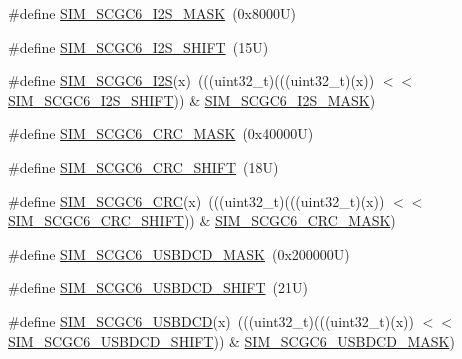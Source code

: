 \begin{DoxyCompactItemize}
\item 
\#define \mbox{\hyperlink{group___s_i_m___register___masks_ga37cb1d6bca1296ed772a4ea87628853b}{S\+I\+M\+\_\+\+S\+C\+G\+C6\+\_\+\+I2\+S\+\_\+\+M\+A\+SK}}~(0x8000\+U)
\item 
\#define \mbox{\hyperlink{group___s_i_m___register___masks_ga012f9b7db6b18ea674e1aac21e8a81df}{S\+I\+M\+\_\+\+S\+C\+G\+C6\+\_\+\+I2\+S\+\_\+\+S\+H\+I\+FT}}~(15\+U)
\item 
\#define \mbox{\hyperlink{group___s_i_m___register___masks_gaf3965076647471e5dd562f891de506a8}{S\+I\+M\+\_\+\+S\+C\+G\+C6\+\_\+\+I2S}}(x)~(((uint32\+\_\+t)(((uint32\+\_\+t)(x)) $<$$<$ \mbox{\hyperlink{group___s_i_m___register___masks_ga012f9b7db6b18ea674e1aac21e8a81df}{S\+I\+M\+\_\+\+S\+C\+G\+C6\+\_\+\+I2\+S\+\_\+\+S\+H\+I\+FT}})) \& \mbox{\hyperlink{group___s_i_m___register___masks_ga37cb1d6bca1296ed772a4ea87628853b}{S\+I\+M\+\_\+\+S\+C\+G\+C6\+\_\+\+I2\+S\+\_\+\+M\+A\+SK}})
\item 
\#define \mbox{\hyperlink{group___s_i_m___register___masks_ga86c274c19f77641dda714eb0cd3fb82f}{S\+I\+M\+\_\+\+S\+C\+G\+C6\+\_\+\+C\+R\+C\+\_\+\+M\+A\+SK}}~(0x40000\+U)
\item 
\#define \mbox{\hyperlink{group___s_i_m___register___masks_gac10c9b2426df8ff8be5656590e5ad323}{S\+I\+M\+\_\+\+S\+C\+G\+C6\+\_\+\+C\+R\+C\+\_\+\+S\+H\+I\+FT}}~(18\+U)
\item 
\#define \mbox{\hyperlink{group___s_i_m___register___masks_ga7e8ce0b7b069947a9bd3a53834537d44}{S\+I\+M\+\_\+\+S\+C\+G\+C6\+\_\+\+C\+RC}}(x)~(((uint32\+\_\+t)(((uint32\+\_\+t)(x)) $<$$<$ \mbox{\hyperlink{group___s_i_m___register___masks_gac10c9b2426df8ff8be5656590e5ad323}{S\+I\+M\+\_\+\+S\+C\+G\+C6\+\_\+\+C\+R\+C\+\_\+\+S\+H\+I\+FT}})) \& \mbox{\hyperlink{group___s_i_m___register___masks_ga86c274c19f77641dda714eb0cd3fb82f}{S\+I\+M\+\_\+\+S\+C\+G\+C6\+\_\+\+C\+R\+C\+\_\+\+M\+A\+SK}})
\item 
\#define \mbox{\hyperlink{group___s_i_m___register___masks_gaffd5a351cb6080fec607562adabf3d21}{S\+I\+M\+\_\+\+S\+C\+G\+C6\+\_\+\+U\+S\+B\+D\+C\+D\+\_\+\+M\+A\+SK}}~(0x200000\+U)
\item 
\#define \mbox{\hyperlink{group___s_i_m___register___masks_gae588068f46ee21f080b0a2af46a324c5}{S\+I\+M\+\_\+\+S\+C\+G\+C6\+\_\+\+U\+S\+B\+D\+C\+D\+\_\+\+S\+H\+I\+FT}}~(21\+U)
\item 
\#define \mbox{\hyperlink{group___s_i_m___register___masks_gae95c444fc304d8aebabce6469c6e84d9}{S\+I\+M\+\_\+\+S\+C\+G\+C6\+\_\+\+U\+S\+B\+D\+CD}}(x)~(((uint32\+\_\+t)(((uint32\+\_\+t)(x)) $<$$<$ \mbox{\hyperlink{group___s_i_m___register___masks_gae588068f46ee21f080b0a2af46a324c5}{S\+I\+M\+\_\+\+S\+C\+G\+C6\+\_\+\+U\+S\+B\+D\+C\+D\+\_\+\+S\+H\+I\+FT}})) \& \mbox{\hyperlink{group___s_i_m___register___masks_gaffd5a351cb6080fec607562adabf3d21}{S\+I\+M\+\_\+\+S\+C\+G\+C6\+\_\+\+U\+S\+B\+D\+C\+D\+\_\+\+M\+A\+SK}})
$$
\end{DoxyCompactItemize}
